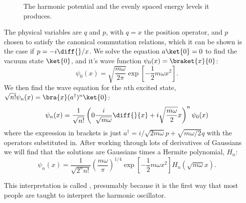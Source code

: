 \documentclass[fleqn]{NotesClass}
\newcommand{\hermit}{{\dagger}}
\begin{document}
    \begin{figure}
        \caption{The harmonic potential and the evenly spaced energy levels it produces.}
        \label{fig:harmonic potential and energy levels}
    \end{figure}
    
    The physical variables are \(q\) and \(p\), with \(q = x\) the position operator, and \(p\) chosen to satisfy the canonical commutation relations, which it can be shown is the case if \(p = -i\diff{}/{x}\).
    We solve the equation \(a \ket{0} = 0\) to find the vacuum state \(\ket{0}\), and it's wave function \(\psi_0(x) = \braket{x}{0}\):
    \begin{equation}
        \psi_0(x) = \sqrt{\frac{m\omega}{2\pi}} \exp\left[ -\frac{1}{2}m\omega x^2 \right].
    \end{equation}
    We then find the wave equation for the \(n\)th excited state, \(\sqrt{n!}\psi_n(x) = \bra{x}(a^\hermit)^n \ket{0}\):
    \begin{equation}
        \psi_n(x) = \frac{1}{\sqrt{n!}} \left( 0\frac{i}{\sqrt{m\omega}} \diff{}{x} + i\sqrt{\frac{m\omega}{2}} x \right)^n \psi_0(x)
    \end{equation}
    where the expression in brackets is just \(a^\hermit = i/\sqrt{2m\omega} p + \sqrt{m\omega/2} q\) with the operators substituted in.
    After working through lots of derivatives of Gaussians we will find that the solutions are Gaussians times a Hermite polynomial, \(H_n\):
    \begin{equation}
        \psi_n(x) = \frac{1}{\sqrt{2^n n!}} \left( \frac{m\omega}{\pi} \right)^{1/4} \exp\left[ -\frac{1}{2}m\omega x^2 \right] H_n\left( \sqrt{m\omega}x \right).
    \end{equation}
    
    This interpretation is called , presumably because it is the first way that most people are taught to interpret the harmonic oscillator.
    
\end{document}
